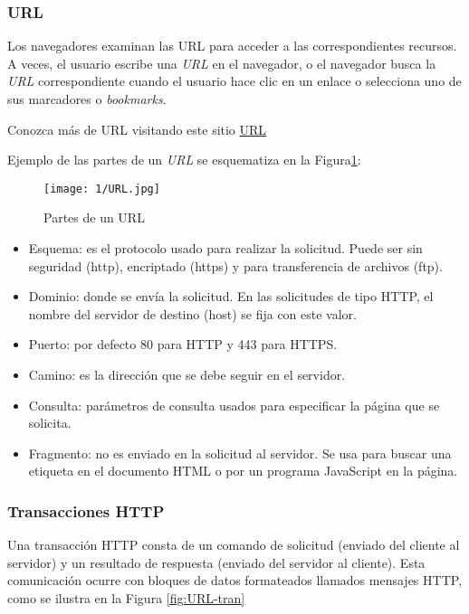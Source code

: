 	\subsubsection{URL}
	 Los navegadores examinan las \gls{URL}	  para acceder a las correspondientes recursos. A veces, el usuario escribe una \textit{URL} en el navegador, o el  navegador busca la \textit{URL} correspondiente cuando el usuario hace clic en un enlace o selecciona uno de sus marcadores o \textit{bookmarks}.
	
 
	\begin{tcolorbox}
		[colback=red!5!white,colframe=red!75!black,fonttitle=\bfseries,title=URL]
			Conozca m\'as de URL visitando este sitio
		\href{https://www.w3.org/TR/url/}{URL}
	\end{tcolorbox}
	
	Ejemplo de las partes de un \textit{URL} se esquematiza en la Figura\ref{fig:URL-HowWork}: 
	
	\begin{figure} %
				\begin{center}
		\texttt{[image: 1/URL.jpg]}
		\caption{Partes de un URL }
		\label{fig:URL-HowWork}
				\end{center}
	\end{figure}

\begin{itemize}
	\item Esquema: es el protocolo usado para realizar la solicitud. Puede ser sin seguridad (http), encriptado (https) y para transferencia de archivos (ftp).
	\item Dominio: donde se envía la solicitud. En las solicitudes de tipo HTTP, el nombre del servidor de destino (host) se fija con este valor.
	\item Puerto: por defecto 80 para HTTP y 443 para HTTPS.
	\item Camino: es la dirección que se debe seguir en el servidor.
	\item Consulta: parámetros de consulta usados para especificar la página que se solicita.
	\item Fragmento: no es enviado en la solicitud al servidor. Se usa para buscar una etiqueta en el documento HTML o por un programa JavaScript en la página.
\end{itemize}
 

	\subsubsection{Transacciones HTTP} 
	Una transacción HTTP consta de un comando de solicitud (enviado del cliente al servidor) y un resultado de respuesta (enviado del servidor al cliente). Esta comunicación ocurre con bloques de datos formateados llamados mensajes HTTP, como se ilustra en la Figura \ref{fig:URL-tran}
	
